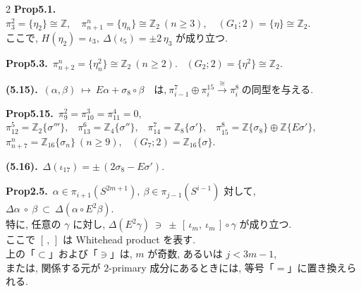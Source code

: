 \documentclass[10pt, leqno]{ltjsarticle}
\newcommand{\gen}[1]{\{#1\}}       %
\numberwithin{equation}{section}
\theoremstyle{plain}
\theoremstyle{definition}
\theoremstyle{remark}
\begin{document}
\begin{paracol}{2}
\noindent
\textbf{Prop5.1.}\
\(\pi^{2}_{3}=\gen{\eta_2}\cong\mathbb Z,\quad
\pi^{n}_{n+1}=\gen{\eta_n}\cong\mathbb Z_2\ (n\ge3),\quad
(G_1;2)=\gen{\eta}\cong\mathbb Z_2.\) \\
ここで, 
\(H(\eta_2)=\iota_3,\ \Delta(\iota_5)=\pm 2\,\eta_3\) が成り立つ. 

\noindent
\textbf{Prop5.3.}\
\(\pi^{n}_{n+2}=\gen{\eta_n^{2}}\cong \mathbb Z_2\ (n\ge2).\) \
\((G_2;2)=\gen{\eta^{2}}\cong \mathbb Z_2 .\)

\noindent
\textbf{(5.15).}\
\((\alpha,\beta)\ \longmapsto\ E\alpha+\sigma_{8}\circ\beta
\quad\text{は,}\
\pi^{7}_{i-1}\oplus\pi^{15}_{i}\xrightarrow{\cong}\pi^{8}_{i}
\ \text{の同型を与える. }\)

\noindent
\textbf{Prop5.15.}\
\(\pi_9^2=\pi_{10}^3=\pi_{11}^4=0,\) \\
\(\pi^{5}_{12}=\mathbb Z_2\gen{\sigma'''},\) \
\(\pi^{6}_{13}=\mathbb Z_4\gen{\sigma''},\) \
\(\pi^{7}_{14}=\mathbb Z_8\gen{\sigma'},\) \
\(\pi^{8}_{15}=\mathbb Z\gen{\sigma_8}\oplus\mathbb Z\gen{E\sigma'},\) \\
\(\pi^{n}_{n+7}=\mathbb Z_{16}\gen{\sigma_n}\ (n\ge9),\) \
\((G_{7};2)=\mathbb Z_{16}\gen{\sigma}.\)

\noindent
\textbf{(5.16).}\
\(\Delta(\iota_{17})=\pm\,(2\sigma_{8}-E\sigma').\)

\noindent
\textbf{Prop2.5.}\
$\alpha\in\pi_{i+1}(S^{2m+1}), \ \beta\in \pi_{j-1}(S^{i-1})$ 対して, 
\(
\Delta\alpha\ \circ\ \beta\ \subset\ \Delta(\alpha\circ E^2\beta).
\)\\
特に, 任意の $\gamma$ に対し,
\(
\Delta(E^2\gamma)\ \ni\ \pm\,[\,\iota_m,\ \iota_m\,]\circ\gamma
\)
が成り立つ. \\
ここで $[\, ,\,]$ は Whitehead product を表す. \\
上の「$\subset$」および「$\ni$」は, $m$ が奇数, 
あるいは $j<3m-1$, \\
または, 関係する元が \(2\)-primary 成分にあるときには, 
等号「$=$」に置き換えられる. 





\end{paracol}
\end{document}
